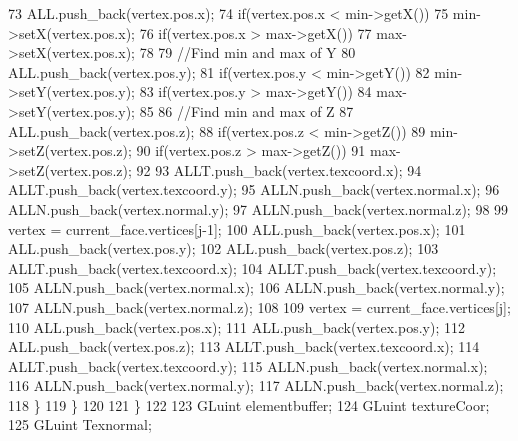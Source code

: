 \begin{DoxyCode}
73                     ALL.push\_back(vertex.pos.x);
74                     \textcolor{keywordflow}{if}(vertex.pos.x < min->getX())
75                         min->setX(vertex.pos.x);
76                     \textcolor{keywordflow}{if}(vertex.pos.x > max->getX())
77                         max->setX(vertex.pos.x);
78                     
79                     \textcolor{comment}{//Find min and max of Y}
80                     ALL.push\_back(vertex.pos.y);
81                     \textcolor{keywordflow}{if}(vertex.pos.y < min->getY())
82                         min->setY(vertex.pos.y);
83                     \textcolor{keywordflow}{if}(vertex.pos.y > max->getY())
84                         max->setY(vertex.pos.y);
85 
86                     \textcolor{comment}{//Find min and max of Z}
87                     ALL.push\_back(vertex.pos.z);
88                     \textcolor{keywordflow}{if}(vertex.pos.z < min->getZ())
89                         min->setZ(vertex.pos.z);
90                     \textcolor{keywordflow}{if}(vertex.pos.z > max->getZ())
91                         max->setZ(vertex.pos.z);
92 
93                     ALLT.push\_back(vertex.texcoord.x);
94                     ALLT.push\_back(vertex.texcoord.y);
95                     ALLN.push\_back(vertex.normal.x);
96                     ALLN.push\_back(vertex.normal.y);
97                     ALLN.push\_back(vertex.normal.z);
98 
99                     vertex = current\_face.vertices[j-1];
100                     ALL.push\_back(vertex.pos.x);
101                     ALL.push\_back(vertex.pos.y);
102                     ALL.push\_back(vertex.pos.z);
103                     ALLT.push\_back(vertex.texcoord.x);
104                     ALLT.push\_back(vertex.texcoord.y);
105                     ALLN.push\_back(vertex.normal.x);
106                     ALLN.push\_back(vertex.normal.y);
107                     ALLN.push\_back(vertex.normal.z);
108                     
109                     vertex = current\_face.vertices[j];
110                     ALL.push\_back(vertex.pos.x);
111                     ALL.push\_back(vertex.pos.y);
112                     ALL.push\_back(vertex.pos.z);
113                     ALLT.push\_back(vertex.texcoord.x);
114                     ALLT.push\_back(vertex.texcoord.y);
115                     ALLN.push\_back(vertex.normal.x);
116                     ALLN.push\_back(vertex.normal.y);
117                     ALLN.push\_back(vertex.normal.z);
118                 \}
119             \}
120 
121         \}
122 
123         GLuint elementbuffer;
124         GLuint textureCoor;
125         GLuint Texnormal;

\end{DoxyCode}
